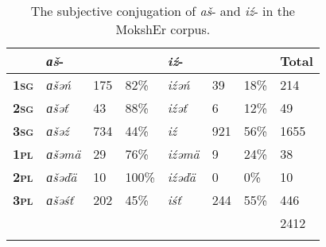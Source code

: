 \documentclass[output=paper]{langsci/langscibook}
\begin{document}
\begin{table}\begin{small}
\caption{The subjective conjugation of \textit{aš}- and \textit{iź}- in the MokshEr corpus.}
\label{tab:2:8}
\begin{tabularx}{\textwidth}{lXXXXXXX}
\lsptoprule
							&\textbf{\textit{ɑš}-}		&			&			&\textbf{\textit{iź}-}	&			&			& \textbf{Total}\\ \midrule
\textbf{\textsc{1sg}}	&\textit{ɑšəń}			&175		& 82\% 	&\textit{iźəń}			&39		&18\% 	&214\\
\textbf{\textsc{2sg}}	&\textit{ɑšəť}				&43		&88\%		&\textit{iźəť}			&6			&12\%		&49\\
\textbf{\textsc{3sg}}	&\textit{ɑšəź}			&734		&44\%		&\textit{iź}				&921		&56\%		&1655\\
\textbf{\textsc{1pl}}		&\textit{ɑšəmä}			&29		&76\% 	&\textit{iźəmä}			&9			&24\%		&38\\
\textbf{\textsc{2pl}}		&\textit{ɑšəďä}			&10		&100\% 	&\textit{iźəďä}			&0 			&0\% 		&10\\
\textbf{\textsc{3pl}}		&\textit{ɑšəśť}			&202		&45\%		&\textit{iśť}				&244		&55\% 	&446\\ \midrule
							&								&			&			&							&			&			& 2412\\
\lspbottomrule
\end{tabularx}\end{small}
\end{table}
\end{document}
